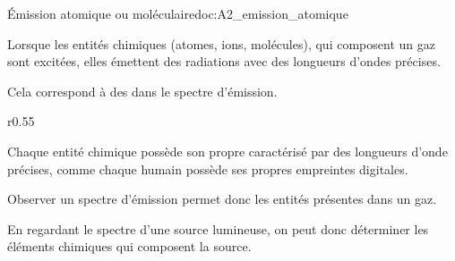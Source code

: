 \begin{doc}{Émission atomique ou moléculaire}{doc:A2_emission_atomique}
  \begin{importants}
    Lorsque les entités chimiques (atomes, ions, molécules), qui composent un gaz sont excitées, elles émettent des radiations avec des longueurs d'ondes précises.
    
    Cela correspond à des  dans le spectre d'émission.
  \end{importants}
  
  \begin{wrapfigure}{r}{0.55\linewidth}
    \centering
    \vspace*{-22pt}
  \end{wrapfigure}
    
  Chaque entité chimique possède son propre  caractérisé par des longueurs d'onde précises, comme chaque humain possède ses propres empreintes digitales.
  \medskip

  Observer un spectre d'émission permet donc  les entités présentes dans un gaz.
  \medskip

  En regardant le spectre d'une source lumineuse, on peut donc déterminer les éléments chimiques qui composent la source.
\end{doc}



